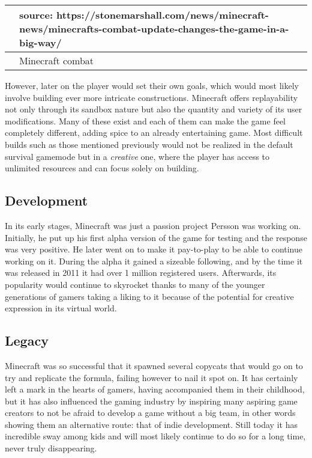 \documentclass[a4paper,10pt]{book}
\begin{document}
 
 \begin{longtable}{p{1mm}|l|}\hline
 
 &   source: https://stonemarshall.com/news/minecraft-news/minecrafts-combat-update-changes-the-game-in-a-big-way/  
 \\\hline
 
 & Minecraft combat 
 \\\hline
 \end{longtable}
 
 
          However, later on the player would set their own goals, which would most likely involve building ever more intricate
          constructions. Minecraft offers replayability not only through its sandbox nature but also the quantity and variety
          of its user modifications. Many of these exist and each of them can make the game feel completely different, adding
          spice to an already entertaining game. Most difficult builds such as those mentioned previously would not be realized
          in the default survival gamemode but in a  \textit{creative } one, where the player has access to unlimited resources and can
          focus solely on building.
         
 
 \subsection{Development }
 
          In its early stages, Minecraft was just a passion project Persson was working on. Initially, he put up his
          first alpha version of the game for testing and the response was very positive. He later went on to
          make it pay-to-play to be able to continue working on it. During the alpha it gained a sizeable
          following, and by the time it was released in 2011 it had over 1 million registered users. Afterwards, its
          popularity would continue to skyrocket thanks to many of the younger generations of gamers taking
          a liking to it because of the potential for creative expression in its virtual world.
         
 
 \subsection{Legacy }
 
          Minecraft was so successful that it spawned several copycats that would go on to try and replicate
          the formula, failing however to nail it spot on. It has certainly left a mark in the hearts of gamers,
          having accompanied them in their childhood, but it has also influenced the gaming industry by
          inspiring many aspiring game creators to not be afraid to develop a game without a big team, in
          other words showing them an alternative route: that of indie development. Still today it has incredible
          sway among kids and will most likely continue to do so for a long time, never truly disappearing.
         
\end{document}
